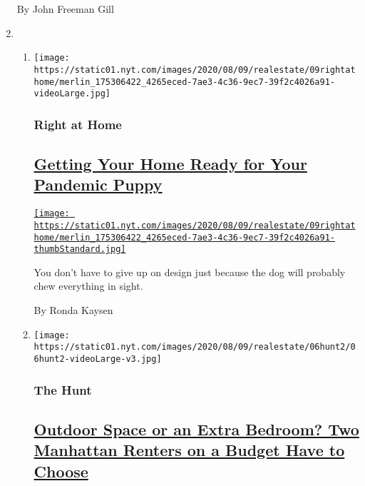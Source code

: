\begin{enumerate}
  By John Freeman Gill
\item
  \begin{enumerate}
  \def\labelenumii{\arabic{enumii}.}
  \item
    \texttt{[image: https://static01.nyt.com/images/2020/08/09/realestate/09rightathome/merlin\_175306422\_4265eced-7ae3-4c36-9ec7-39f2c4026a91-videoLarge.jpg]}

    \hypertarget{right-at-home}{%
    \subsubsection{Right at Home}\label{right-at-home}}

    \hypertarget{getting-your-home-ready-for-your-pandemic-puppy}{%
    \subsection{\texorpdfstring{\href{/2020/08/07/realestate/pandemic-puppy-home-design.html}{Getting
    Your Home Ready for Your Pandemic
    Puppy}}{Getting Your Home Ready for Your Pandemic Puppy}}\label{getting-your-home-ready-for-your-pandemic-puppy}}

    \href{/2020/08/07/realestate/pandemic-puppy-home-design.html}{\texttt{[image: https://static01.nyt.com/images/2020/08/09/realestate/09rightathome/merlin\_175306422\_4265eced-7ae3-4c36-9ec7-39f2c4026a91-thumbStandard.jpg]}}

    You don't have to give up on design just because the dog will
    probably chew everything in sight.

    By Ronda Kaysen
  \item
    \texttt{[image: https://static01.nyt.com/images/2020/08/09/realestate/06hunt2/06hunt2-videoLarge-v3.jpg]}

    \hypertarget{the-hunt}{%
    \subsubsection{The Hunt}\label{the-hunt}}

    \hypertarget{outdoor-space-or-an-extra-bedroom-two-manhattan-renters-on-a-budget-have-to-choose}{%
    \subsection{\texorpdfstring{\href{/interactive/2020/08/06/realestate/06hunt-rogala.html}{Outdoor
    Space or an Extra Bedroom? Two Manhattan Renters on a Budget Have to
    Choose}}{Outdoor Space or an Extra Bedroom? Two Manhattan Renters on a Budget Have to Choose}}\label{outdoor-space-or-an-extra-bedroom-two-manhattan-renters-on-a-budget-have-to-choose}}


\end{enumerate}
\end{enumerate}
